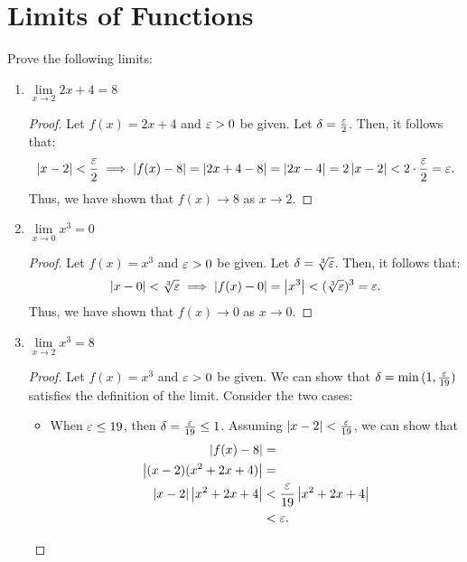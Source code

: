 \section{Limits of Functions}

\begin{problem}
  Prove the following limits:

  \begin{enumerate}[label=(\alph*)]
    \item $\lim\limits_{x \to 2} 2x + 4 = 8$ 
      
      \begin{proof}
        Let $f(x) = 2x + 4$ and $\varepsilon > 0$ be given. Let $\delta = \frac{\varepsilon}{2}$. Then, it follows that: 
        \[
          \left\lvert x - 2 \right\rvert < \frac{\varepsilon}{2} \implies \left\lvert f(x) - 8 \right\rvert = \left\lvert 2x + 4 - 8 \right\rvert = \left\lvert 2x - 4 \right\rvert = 2\left\lvert x - 2 \right\rvert < 2\cdot\frac{\varepsilon}{2} = \varepsilon.
        \]
        Thus, we have shown that $f(x) \to 8$ as $x \to 2$. 
      \end{proof}

    \item $\lim\limits_{x \to 0} x^{3} = 0$ 
      \begin{proof}
        Let $f(x) = x^{3}$ and $\varepsilon > 0$ be given. Let $\delta = \sqrt[3]{\varepsilon}$. Then, it follows that: 
        \[
          \left\lvert x - 0 \right\rvert < \sqrt[3]{\varepsilon} \implies \left\lvert f(x) - 0 \right\rvert = \left\lvert x^{3} \right\rvert < (\sqrt[3]{\varepsilon})^{3} = \varepsilon.
        \]
        Thus, we have shown that $f(x) \to 0$ as $x \to 0$. 
      \end{proof} 

    \item $\lim\limits_{x \to 2} x^{3} = 8$ 
      \begin{proof}
        Let $f(x) = x^{3}$ and $\varepsilon > 0$ be given. We can show that $\delta = \min{(1, \frac{\varepsilon}{19})}$
        satisfies the definition of the limit. Consider the two cases:
        \begin{itemize} 
          \item When $\varepsilon \leq 19$, then $\delta = \frac{\varepsilon}{19} \leq 1$. Assuming
            $\left\lvert x - 2 \right\rvert < \frac{\varepsilon}{19}$, we can show that
              \begin{align*}
                \left\lvert f(x) - 8 \right\rvert &= \\
                \left\lvert (x-2)(x^{2} +2x + 4) \right\rvert &= \\
                \left\lvert x-2 \right\rvert \left\lvert x^{2} + 2x + 4 \right\rvert &< \frac{\varepsilon}{19} \left\lvert x^{2} + 2x + 4 \right\rvert \\ 
                                               &< \varepsilon.
              \end{align*}


\end{itemize}
\end{proof}
\end{enumerate}
\end{problem}
